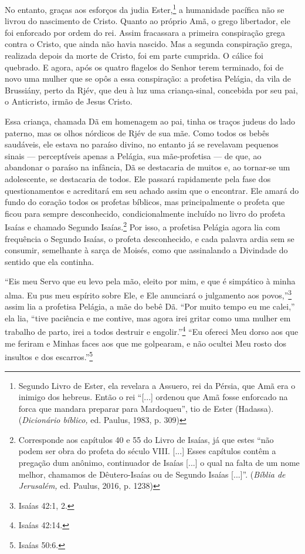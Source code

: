 No entanto, graças aos esforços da judia Ester,\footnote{Segundo Livro
  de Ester, ela revelara a Assuero, rei da Pérsia, que Amã era o inimigo
  dos hebreus. Então o rei ``{[}...{]} ordenou que Amã fosse enforcado
  na forca que mandara preparar para Mardoqueu'', tio de Ester
  (Hadassa). (\emph{Dicionário bíblico,} ed. Paulus, 1983, p. 309)} a
humanidade pacífica não se livrou do nascimento de Cristo. Quanto ao
próprio Amã, o grego libertador, ele foi enforcado por ordem do rei.
Assim fracassara a primeira conspiração grega contra o Cristo, que ainda
não havia nascido. Mas a segunda conspiração grega, realizada depois da
morte de Cristo, foi em parte cumprida. O cálice foi quebrado. E agora,
após os quatro flagelos do Senhor terem terminado, foi de novo uma
mulher que se opôs a essa conspiração: a profetisa Pelágia, da vila de
Brussiány, perto da Rjév, que deu à luz uma criança-sinal, concebida por
seu pai, o Anticristo, irmão de Jesus Cristo.

Essa criança, chamada Dã em homenagem ao pai, tinha os traços judeus do
lado paterno, mas os olhos nórdicos de Rjév de sua mãe. Como todos os
bebês saudáveis, ele estava no paraíso divino, no entanto já se
revelavam pequenos sinais --- perceptíveis apenas a Pelágia, sua
mãe-profetisa --- de que, ao abandonar o paraíso na infância, Dã se
destacaria de muitos e, ao tornar-se um adolescente, se destacaria de
todos. Ele passará rapidamente pela fase dos questionamentos e
acreditará em seu achado assim que o encontrar. Ele amará do fundo do
coração todos os profetas bíblicos, mas principalmente o profeta que
ficou para sempre desconhecido, condicionalmente incluído no livro do
profeta Isaías e chamado Segundo Isaías.\footnote{Corresponde aos
  capítulos 40 e 55 do Livro de Isaías, já que estes ``não podem ser
  obra do profeta do século VIII. {[}...{]} Esses capítulos contêm a
  pregação dum anônimo, continuador de Isaías {[}...{]} o qual na falta
  de um nome melhor, chamamos de Dêutero-Isaías ou de Segundo Isaías
  {[}...{]}''. (\emph{Bíblia de Jerusalém,} ed. Paulus, 2016, p. 1238)}
Por isso, a profetisa Pelágia agora lia com frequência o Segundo Isaías,
o profeta desconhecido, e cada palavra ardia sem se consumir, semelhante
à sarça de Moisés, como que assinalando a Divindade do sentido que ela
continha.

``Eis meu Servo que eu levo pela mão, eleito por mim, e que é simpático
à minha alma. Eu pus meu espírito sobre Ele, e Ele anunciará o
julgamento aos povos,''\footnote{Isaías 42:1, 2.} assim lia a profetisa
Pelágia, a mãe do bebê Dã. ``Por muito tempo eu me calei,'' ela lia,
``tive paciência e me contive, mas agora irei gritar como uma mulher em
trabalho de parto, irei a todos destruir e engolir.''\footnote{Isaías
  42:14.} ``Eu ofereci Meu dorso aos que me feriram e Minhas faces aos
que me golpearam, e não ocultei Meu rosto dos insultos e dos
escarros.''\footnote{Isaías 50:6.}

